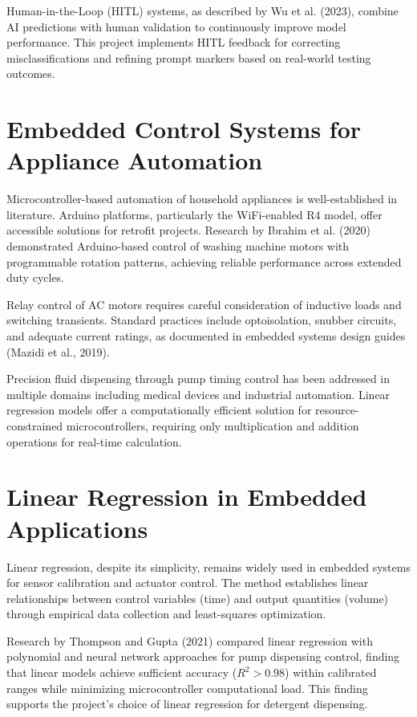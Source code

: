 Human-in-the-Loop (HITL) systems, as described by Wu et al. (2023), combine AI predictions with human validation to continuously improve model performance. This project implements HITL feedback for correcting misclassifications and refining prompt markers based on real-world testing outcomes.

\section{Embedded Control Systems for Appliance Automation}
Microcontroller-based automation of household appliances is well-established in literature. Arduino platforms, particularly the WiFi-enabled R4 model, offer accessible solutions for retrofit projects. Research by Ibrahim et al. (2020) demonstrated Arduino-based control of washing machine motors with programmable rotation patterns, achieving reliable performance across extended duty cycles.

Relay control of AC motors requires careful consideration of inductive loads and switching transients. Standard practices include optoisolation, snubber circuits, and adequate current ratings, as documented in embedded systems design guides (Mazidi et al., 2019).

Precision fluid dispensing through pump timing control has been addressed in multiple domains including medical devices and industrial automation. Linear regression models offer a computationally efficient solution for resource-constrained microcontrollers, requiring only multiplication and addition operations for real-time calculation.

\section{Linear Regression in Embedded Applications}
Linear regression, despite its simplicity, remains widely used in embedded systems for sensor calibration and actuator control. The method establishes linear relationships between control variables (time) and output quantities (volume) through empirical data collection and least-squares optimization.

Research by Thompson and Gupta (2021) compared linear regression with polynomial and neural network approaches for pump dispensing control, finding that linear models achieve sufficient accuracy (\(R^2 > 0.98\)) within calibrated ranges while minimizing microcontroller computational load. This finding supports the project's choice of linear regression for detergent dispensing.

